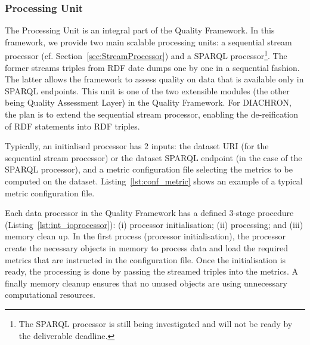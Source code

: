 \subsubsection{Processing Unit}
\label{sec:processingUnit}
The Processing Unit is an integral part of the Quality Framework.
In this framework, we provide two main scalable processing units: a sequential stream processor (cf. Section~\ref{sec:StreamProcessor}) and a SPARQL processor\footnote{The SPARQL processor is still being investigated and will not be ready by the deliverable deadline.}.
The former streams triples from RDF date dumps one by one in a sequential fashion.
The latter allows the framework to assess quality on data that is available only in SPARQL endpoints. 
This unit is one of the two extensible modules (the other being Quality Assessment Layer) in the Quality Framework.
For DIACHRON, the plan is to extend the sequential stream processor, enabling the de-reification of RDF statements into RDF triples.

Typically, an initialised processor has 2 inputs: the dataset URI (for the sequential stream processor) or the dataset SPARQL endpoint (in the case of the SPARQL processor), and a metric configuration file selecting the metrics to be computed on the dataset.
Listing~\ref{lst:conf_metric} shows an example of a typical metric configuration file.
 
Each data processor in the Quality Framework has a defined 3-stage procedure (Listing~\ref{lst:int_ioprocessor}): (i) processor initialisation; (ii) processing; and (iii) memory clean up.
In the first process (processor initialisation), the processor create the necessary objects in memory to process data and load the required metrics that are instructed in the configuration file.
Once the initialisation is ready, the processing is done by passing the streamed triples into the metrics.
A finally memory cleanup ensures that no unused objects are using unnecessary computational resources.
 

